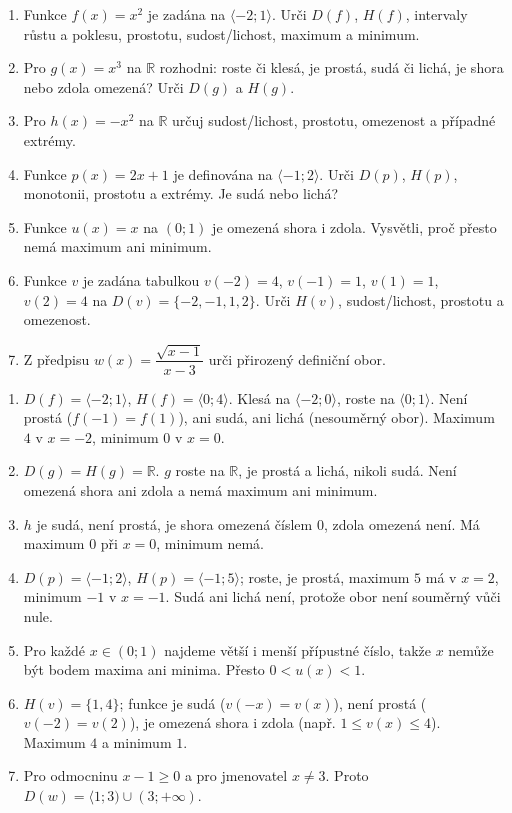 \documentclass[11pt,a4paper]{article}
\begin{document}
\begin{zadaniReseniBox}[title={Domácí úkol}]
\begin{enumerate}[label=\alph*)]
\item Funkce $f(x)=x^2$ je zadána na $\langle-2;1\rangle$.
    Urči $D(f)$, $H(f)$, intervaly růstu a poklesu,
    prostotu, sudost/lichost, maximum a minimum.
\item Pro $g(x)=x^3$ na $\mathbb R$ rozhodni:
    roste či klesá, je prostá, sudá či lichá,
    je shora nebo zdola omezená? Urči $D(g)$ a $H(g)$.
\item Pro $h(x)=-x^2$ na $\mathbb R$ určuj
    sudost/lichost, prostotu, omezenost a případné extrémy.
\item Funkce $p(x)=2x+1$ je definována na $\langle-1;2\rangle$.
    Urči $D(p)$, $H(p)$, monotonii, prostotu a extrémy.
    Je sudá nebo lichá?
\item Funkce $u(x)=x$ na $(0;1)$ je omezená shora i zdola.
    Vysvětli, proč přesto nemá maximum ani minimum.
\item Funkce $v$ je zadána tabulkou
    $v(-2)=4$, $v(-1)=1$, $v(1)=1$, $v(2)=4$
    na $D(v)=\{-2,-1,1,2\}$.
    Urči $H(v)$, sudost/lichost, prostotu a omezenost.
\item Z předpisu $w(x)=\dfrac{\sqrt{x-1}}{x-3}$
    urči přirozený definiční obor.
\end{enumerate}
\tcblower
\begin{enumerate}[label=\alph*)]
\item $D(f)=\langle-2;1\rangle$, $H(f)=\langle0;4\rangle$.
    Klesá na $\langle-2;0\rangle$, roste na $\langle0;1\rangle$.
    Není prostá ($f(-1)=f(1)$), ani sudá, ani lichá
    (nesouměrný obor). Maximum $4$ v $x=-2$,
    minimum $0$ v $x=0$.
\item $D(g)=H(g)=\mathbb R$. $g$ roste na $\mathbb R$,
    je prostá a lichá, nikoli sudá.
    Není omezená shora ani zdola a nemá maximum ani minimum.
\item $h$ je sudá, není prostá, je shora omezená číslem $0$,
    zdola omezená není. Má maximum $0$ při $x=0$,
    minimum nemá.
\item $D(p)=\langle-1;2\rangle$,
    $H(p)=\langle-1;5\rangle$; roste, je prostá,
    maximum $5$ má v $x=2$, minimum $-1$ v $x=-1$.
    Sudá ani lichá není, protože obor není souměrný vůči nule.
\item Pro každé $x\in(0;1)$ najdeme větší i menší
    přípustné číslo, takže $x$ nemůže být bodem
    maxima ani minima. Přesto $0<u(x)<1$.
\item $H(v)=\{1,4\}$; funkce je sudá
    ($v(-x)=v(x)$), není prostá
    ($v(-2)=v(2)$), je omezená shora i zdola
    (např. $1\le v(x)\le4$). Maximum $4$ a minimum $1$.
\item Pro odmocninu $x-1\ge0$ a pro jmenovatel $x\ne3$.
    Proto $D(w)=\langle1;3)\cup(3;+\infty)$.
\end{enumerate}
\end{zadaniReseniBox}
\end{document}

